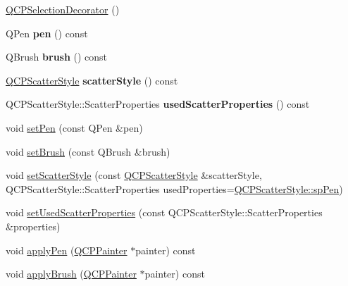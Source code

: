 \begin{DoxyCompactItemize}
\item 
\hyperlink{classQCPSelectionDecorator_aa145480d9a062cd176fe30900bb7bca8}{Q\+C\+P\+Selection\+Decorator} ()
\item 
\mbox{\label{classQCPSelectionDecorator_a9307a60c9759223367909aed2d05ad91}} 
Q\+Pen {\bfseries pen} () const
\item 
\mbox{\label{classQCPSelectionDecorator_a783b643aa52120a25308fc501b9998b1}} 
Q\+Brush {\bfseries brush} () const
\item 
\mbox{\label{classQCPSelectionDecorator_aa6558f6f270a188bb633386aba0d1ae4}} 
\hyperlink{classQCPScatterStyle}{Q\+C\+P\+Scatter\+Style} {\bfseries scatter\+Style} () const
\item 
\mbox{\label{classQCPSelectionDecorator_ab2019bf31dde39f1ec028e3810dfc08b}} 
Q\+C\+P\+Scatter\+Style\+::\+Scatter\+Properties {\bfseries used\+Scatter\+Properties} () const
\item 
void \hyperlink{classQCPSelectionDecorator_ac2c8192e1e294aa3a4a7f32a859e3d76}{set\+Pen} (const Q\+Pen \&pen)
\item 
void \hyperlink{classQCPSelectionDecorator_aa74b626be518ea17055f918d423c8c2d}{set\+Brush} (const Q\+Brush \&brush)
\item 
void \hyperlink{classQCPSelectionDecorator_ab403a613289714ff4fd4a0c0371ab116}{set\+Scatter\+Style} (const \hyperlink{classQCPScatterStyle}{Q\+C\+P\+Scatter\+Style} \&scatter\+Style, Q\+C\+P\+Scatter\+Style\+::\+Scatter\+Properties used\+Properties=\hyperlink{classQCPScatterStyle_a8974f6a20f8f6eea7781f0e6af9deb46aa04d012e7c03e455db2b68fdd55c2a04}{Q\+C\+P\+Scatter\+Style\+::sp\+Pen})
\item 
void \hyperlink{classQCPSelectionDecorator_a808c1607cd4e83869c04986e332455c0}{set\+Used\+Scatter\+Properties} (const Q\+C\+P\+Scatter\+Style\+::\+Scatter\+Properties \&properties)
\item 
void \hyperlink{classQCPSelectionDecorator_a75098893f7d08660ea449206810679d7}{apply\+Pen} (\hyperlink{classQCPPainter}{Q\+C\+P\+Painter} $\ast$painter) const
\item 
void \hyperlink{classQCPSelectionDecorator_a225544527d51b49546b70d0e6d655a34}{apply\+Brush} (\hyperlink{classQCPPainter}{Q\+C\+P\+Painter} $\ast$painter) const

\end{DoxyCompactItemize}
